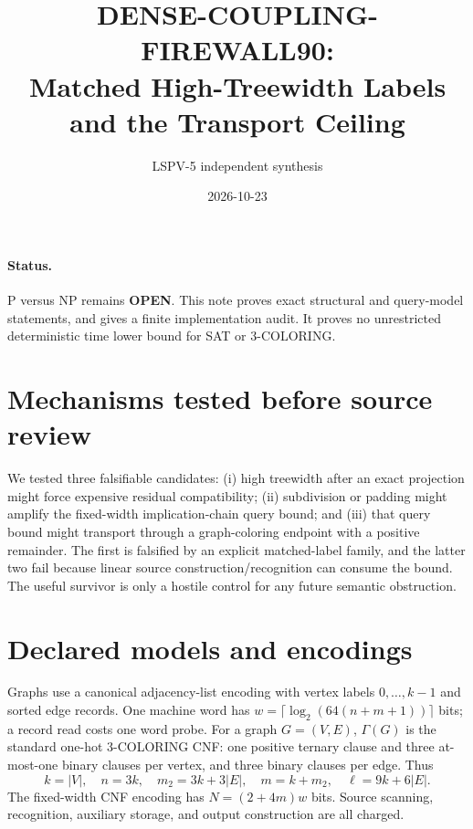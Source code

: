 \documentclass[11pt]{article}
\title{DENSE-COUPLING-FIREWALL90:\\Matched High-Treewidth Labels and the Transport Ceiling}
\author{LSPV-5 independent synthesis}
\date{2026-10-23}
\begin{document}
\maketitle

\paragraph{Status.}
P versus NP remains \textbf{OPEN}.  This note proves exact structural and
query-model statements, and gives a finite implementation audit.  It proves no
unrestricted deterministic time lower bound for SAT or 3-COLORING.

\section{Mechanisms tested before source review}
We tested three falsifiable candidates: (i) high treewidth after an exact
projection might force expensive residual compatibility; (ii) subdivision or
padding might amplify the fixed-width implication-chain query bound; and
(iii) that query bound might transport through a graph-coloring endpoint with
a positive remainder.  The first is falsified by an explicit matched-label
family, and the latter two fail because linear source construction/recognition
can consume the bound.  The useful survivor is only a hostile control for any
future semantic obstruction.

\section{Declared models and encodings}
Graphs use a canonical adjacency-list encoding with vertex labels
$0,\ldots,k-1$ and sorted edge records.  One machine word has
$w=\lceil\log_2(64(n+m+1))\rceil$ bits; a record read costs one word probe.
For a graph $G=(V,E)$, $\Gamma(G)$ is the standard one-hot 3-COLORING CNF:
one positive ternary clause and three at-most-one binary clauses per vertex,
and three binary clauses per edge.  Thus
\[
 k=|V|,\quad n=3k,\quad m_2=3k+3|E|,
 \quad m=k+m_2,\quad \ell=9k+6|E|.
\]
The fixed-width CNF encoding has $N=(2+4m)w$ bits.  Source scanning,
recognition, auxiliary storage, and output construction are all charged.
\end{document}
